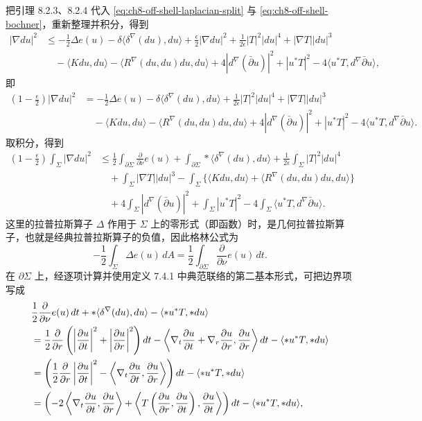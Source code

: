把引理 8.2.3、8.2.4 代入 \eqref{eq:ch8-off-shell-laplacian-split} 与
\eqref{eq:ch8-off-shell-bochner}，重新整理并积分，得到
\begin{align*}
 |\nabla du|^2
 &\leq-\frac12\Delta e(u)-\delta\langle\delta^\nabla(du),du\rangle
 +\frac\epsilon2|\nabla du|^2+\frac1{2\epsilon}|T|^2|du|^4+|\nabla T||du|^3\\
 &\quad-\langle Kdu,du\rangle-\langle R^\nabla(du,du)du,du\rangle
 +4|d^\nabla(\bar\partial u)|^2+|u^*T|^2
 -4\langle u^*T,d^\nabla\bar\partial u\rangle,
\end{align*}
即
\begin{align*}
 \left(1-\frac\epsilon2\right)|\nabla du|^2
 &=-\frac12\Delta e(u)-\delta\langle\delta^\nabla(du),du\rangle
 +\frac1{2\epsilon}|T|^2|du|^4+|\nabla T||du|^3\\
 &\quad-\langle Kdu,du\rangle-\langle R^\nabla(du,du)du,du\rangle
 +4|d^\nabla(\bar\partial u)|^2+|u^*T|^2
 -4\langle u^*T,d^\nabla\bar\partial u\rangle.
\end{align*}
取积分，得到
\begin{align*}
 \left(1-\frac\epsilon2\right)\int_\Sigma|\nabla du|^2
 &\leq\frac12\int_{\partial\Sigma}\frac{\partial}{\partial\nu}e(u)
 +\int_{\partial\Sigma}*\langle\delta^\nabla(du),du\rangle
 +\frac1{2\epsilon}\int_\Sigma|T|^2|du|^4\\
 &\quad+\int_\Sigma|\nabla T||du|^3
 -\int_\Sigma\{\langle Kdu,du\rangle+\langle R^\nabla(du,du)du,du\rangle\}\\
 &\quad+4\int_\Sigma|d^\nabla(\bar\partial u)|^2+\int_\Sigma|u^*T|^2
 -4\int_\Sigma\langle u^*T,d^\nabla\bar\partial u\rangle.
\end{align*}
这里的拉普拉斯算子 $\Delta$ 作用于 $\Sigma$ 上的零形式（即函数）时，是几何拉普拉斯算子，也就是经典拉普拉斯算子的负值，因此格林公式为
\[
 -\frac12\int_\Sigma\Delta e(u)\,dA
 =\frac12\int_{\partial\Sigma}\frac\partial{\partial\nu}e(u)\,dt.
\]
在 $\partial\Sigma$ 上，经逐项计算并使用定义 7.4.1 中典范联络的第二基本形式，可把边界项写成
\begin{align}
 &\frac12\frac\partial{\partial\nu}e(u)\,dt
 +*\langle\delta^\nabla(du),du\rangle-\langle*u^*T,*du\rangle\notag\\
 &=\frac12\frac\partial{\partial r}
 \left(\left|\frac{\partial u}{\partial t}\right|^2
 +\left|\frac{\partial u}{\partial r}\right|^2\right)dt
 -\left\langle\nabla_t\frac{\partial u}{\partial t}
 +\nabla_r\frac{\partial u}{\partial r},\frac{\partial u}{\partial r}\right\rangle dt
 -\langle*u^*T,*du\rangle\notag\\
 &=\left(\frac12\frac\partial{\partial r}
 \left|\frac{\partial u}{\partial t}\right|^2
 -\left\langle\nabla_t\frac{\partial u}{\partial t},
 \frac{\partial u}{\partial r}\right\rangle\right)dt
 -\langle*u^*T,*du\rangle\notag\\
 &=\left(-2\left\langle\nabla_t\frac{\partial u}{\partial t},
 \frac{\partial u}{\partial r}\right\rangle
 +\left\langle T\left(\frac{\partial u}{\partial r},
 \frac{\partial u}{\partial t}\right),
 \frac{\partial u}{\partial t}\right\rangle\right)dt
 -\langle*u^*T,*du\rangle,
\label{eq:ch8-boundary-term-computation}
\end{align}
